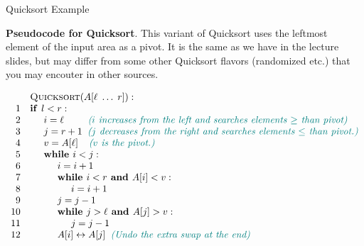 \documentclass[a4paper,12pt]{article}
\begin{document}

\thispagestyle{empty}

\begin{center}
{\Large Quicksort Example}\\
\end{center}

\noindent


\vspace{10pt}
{\bf Pseudocode for Quicksort}. This variant of Quicksort
uses the leftmost element of the input area as a pivot. 
It is the same as
we have in the lecture slides, but may differ from 
some other Quicksort flavors (randomized etc.) that you may encouter
in other sources.

\[
\begin{array}{rl}
 & \text{\textsc{Quicksort}}(A[\ell\;\ldots\;r]):\\
1 & \text{\textbf{if\ }} l<r:\\
2 & \hspace{.5cm} i = \ell \;\;\;\;\;\;\;\;\; \textcolor{teal}{\text{\em ($i$ increases from the left and searches elements $\geq$ than pivot)}}\\
3 & \hspace{.5cm} j = r+1	\;\; \textcolor{teal}{\text{\em ($j$ decreases from the right and searches elements $\leq$ than pivot.)}}\\	
4 & \hspace{.5cm} v = A[\ell] \;\;\;\; \textcolor{teal}{\text{\em ($v$ is the pivot.)}}\\
5 & \hspace{.5cm} \text{\textbf{while\ }} i<j:\\
6 & \hspace{1.0cm} i = i+1\\
7 & \hspace{1.0cm} \text{\textbf{while\ }} i<r \text{\textbf{\ and\ }} A[i]<v:\\
8 & \hspace{1.5cm} i = i+1\\
9 & \hspace{1.0cm} j = j-1\\
10 & \hspace{1.0cm} \text{\textbf{while\ }} j>\ell \text{\textbf{\ and\ }} A[j]>v:\\
11 & \hspace{1.5cm} j = j-1\\
12 & \hspace{1.0cm} A[i] \leftrightarrow A[j] \;\; \textcolor{teal}{\text{\em (Undo the extra swap at the end)}}\\

\end{array}\]
\end{document}
